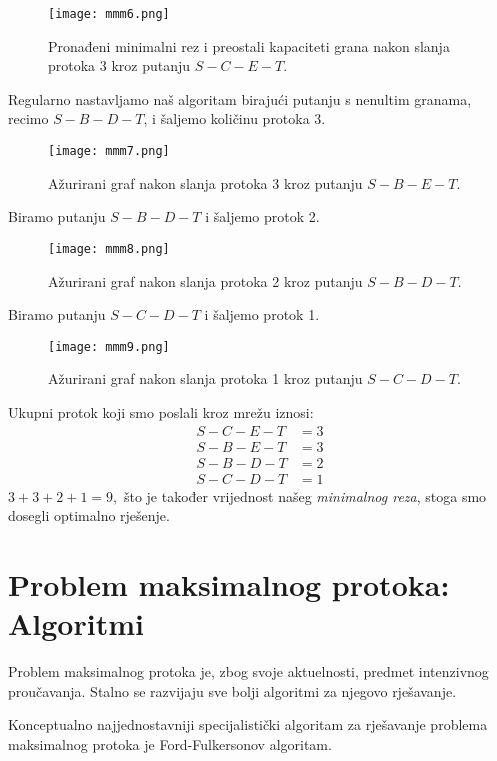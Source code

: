 \documentclass[11pt, a4paper]{article}
\begin{document}
	\begin{figure}[h]
		\centering
		\texttt{[image: mmm6.png]}
		\caption{Pronađeni minimalni rez i preostali kapaciteti grana nakon slanja protoka 3 kroz putanju $S-C-E-T$.}
		\label{fig:mmm6}
	\end{figure}
	
	\pagebreak
	Regularno nastavljamo naš algoritam birajući putanju s nenultim granama, recimo $S-B-D-T$, i šaljemo količinu protoka 3.
	\begin{figure}[h]
		\centering
		\texttt{[image: mmm7.png]}
		\caption{Ažurirani graf nakon slanja protoka 3 kroz putanju $S-B-E-T$.}
		\label{fig:mmm7}
	\end{figure}
	
	Biramo putanju $S-B-D-T$ i šaljemo protok 2.
	\begin{figure}[h]
		\centering
		\texttt{[image: mmm8.png]}
		\caption{Ažurirani graf nakon slanja protoka 2 kroz putanju $S-B-D-T$.}
		\label{fig:mmm8}
	\end{figure}
	
	\pagebreak
	Biramo putanju $S-C-D-T$ i šaljemo protok 1.
	\begin{figure}[h]
		\centering
		\texttt{[image: mmm9.png]}
		\caption{Ažurirani graf nakon slanja protoka 1 kroz putanju $S-C-D-T$.}
		\label{fig:mmm9}
	\end{figure}
	
	Ukupni protok koji smo poslali kroz mrežu iznosi:
	\begin{align*}
		S-C-E-T &= 3\\
		S-B-E-T &= 3\\
		S-B-D-T &= 2\\
		S-C-D-T &= 1
	\end{align*}
	$3+3+2+1 = 9, $ što je također vrijednost našeg \textit{minimalnog reza}, stoga smo dosegli optimalno rješenje.
	
	\newpage
	\section{Problem maksimalnog protoka: Algoritmi}
	
	Problem maksimalnog protoka je, zbog svoje aktuelnosti, predmet intenzivnog proučavanja. Stalno se razvijaju sve bolji algoritmi za njegovo rješavanje.
	
	Konceptualno najjednostavniji specijalistički algoritam za rješavanje problema maksimalnog protoka
	je Ford-Fulkersonov algoritam.
	
\end{document}
